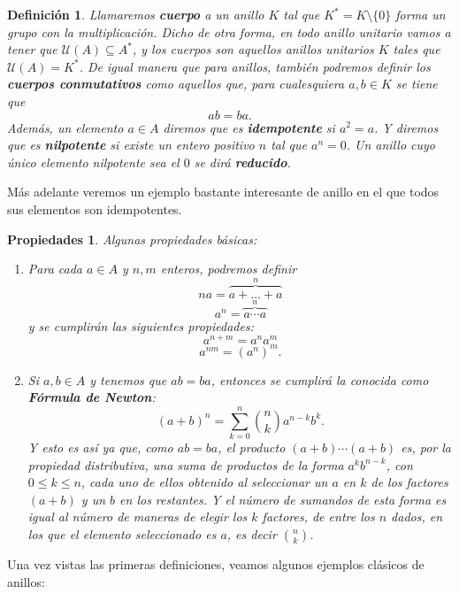 \documentclass[12pt]{article}
\newtheorem{definition}[theorem]{Definición}
\newtheorem{properties}{Propiedades}[theorem]
\begin{document}
\begin{definition} Llamaremos \textbf{cuerpo} a un anillo $K$ tal que $K^{\ast} = K \setminus \lbrace 0 \rbrace$ forma un grupo con la multiplicación. Dicho de otra forma, en todo anillo unitario vamos a tener que $\mathcal{U}(A) \subseteq A^{\ast}$, y los cuerpos son aquellos anillos unitarios $K$ tales que $\mathcal{U}(A) = K^{\ast}$. De igual manera que para anillos, también podremos definir los \textbf{cuerpos conmutativos} como aquellos que, para cualesquiera $a,b \in K$ se tiene que $$ab = ba.$$
Además, un elemento $a \in A$ diremos que es \textbf{idempotente} si $a^{2} = a$. Y diremos que es \textbf{nilpotente} si existe un entero positivo $n$ tal que $a^{n} = 0$. Un anillo cuyo único elemento nilpotente sea el $0$ se dirá \textbf{reducido}.
\end{definition}

Más adelante veremos un ejemplo bastante interesante de anillo en el que todos sus elementos son idempotentes.

\begin{properties}Algunas propiedades básicas: \begin{enumerate}
\item Para cada $a \in A$ y $n,m$ enteros, podremos definir $$na = \overbrace{a+ \ldots +a}^{n}$$ $$a^{n} = \overbrace{a \cdots a}^{n}$$ y se cumplirán las siguientes propiedades: $$a^{n+m} = a^{n}a^{m}$$ $$a^{nm} = (a^{n})^{m}.$$
\item Si $a,b \in A$ y tenemos que $ab = ba$, entonces se cumplirá la conocida como \textbf{Fórmula de Newton}:
$$(a+b)^{n} = \sum_{k=0}^{n} {n \choose k}a^{n-k}b^{k}.$$ Y esto es así ya que, como $ab = ba$, el producto $(a+b)\cdots(a+b)$ es, por la propiedad distributiva, una suma de productos de la forma $a^{k}b^{n-k}$, con $0 \leq k \leq n$, cada uno de ellos obtenido al seleccionar un $a$ en $k$ de los factores $(a+b)$ y un $b$ en los restantes. Y el número de sumandos de esta forma es igual al número de maneras de elegir los $k$ factores, de entre los $n$ dados, en los que el elemento seleccionado es $a$, es decir ${n \choose k}$.
\end{enumerate} 
\end{properties}

Una vez vistas las primeras definiciones, veamos algunos ejemplos clásicos de anillos:
\end{document}
